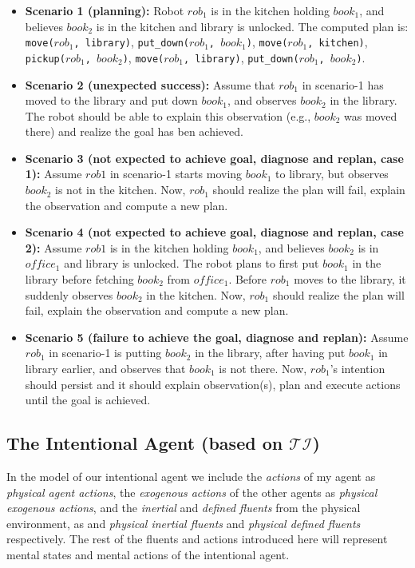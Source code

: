 \documentclass[11pt, oneside]{article}
\newcommand{\stt}[1]{{\small\texttt{#1}}}
\begin{document}
\begin{itemize}
\item \textbf{Scenario 1 (planning):} Robot $rob_1$ is in the kitchen
  holding $book_1$, and believes $book_2$ is in the kitchen and
  library is unlocked. The computed plan is: \stt{move($rob_1$,
    library)}, \stt{put\_down($rob_1$, $book_1$)}, \stt{move($rob_1$,
    kitchen)}, \stt{pickup($rob_1$, $book_2$)}, \stt{move($rob_1$,
    library)}, \stt{put\_down($rob_1$, $book_2$)}.

\item \textbf{Scenario 2 (unexpected success):} Assume that $rob_1$ in
  scenario-1 has moved to the library and put down $book_1$, and
  observes $book_2$ in the library. The robot should be able to
  explain this observation (e.g., $book_2$ was moved there) and
  realize the goal has ben achieved.

\item \textbf{Scenario 3 (not expected to achieve goal, diagnose and
    replan, case 1):} Assume $rob1$ in scenario-1 starts moving
  $book_1$ to library, but observes $book_2$ is not in the kitchen.
  Now, $rob_1$ should realize the plan will fail, explain the
  observation and compute a new plan.

\item \textbf{Scenario 4 (not expected to achieve goal, diagnose and
    replan, case 2):} Assume $rob1$ is in the kitchen holding $book_1$,
  and believes $book_2$ is in $office_1$ and library is unlocked. The
  robot plans to first put $book_1$ in the library before fetching
  $book_2$ from $office_1$. Before $rob_1$ moves to the library, it
  suddenly observes $book_2$ in the kitchen.  Now, $rob_1$ should
  realize the plan will fail, explain the observation and compute a
  new plan.

\item \textbf{Scenario 5 (failure to achieve the goal, diagnose and
    replan):} Assume $rob_1$ in scenario-1 is putting $book_2$ in the
  library, after having put $book_1$ in library earlier, and observes
  that $book_1$ is not there. Now, $rob_1$'s intention should persist
  and it should explain observation(s), plan and execute actions until
  the goal is achieved.
\end{itemize}




\subsection{The Intentional Agent (based on $\mathcal{TI}$) }
In the model of our intentional agent we include the \emph{actions} of my agent as \emph{physical  agent  actions},  the \emph{exogenous actions} of the other agents as \emph{physical exogenous actions}, and the \emph{inertial} and \emph{defined fluents} from the physical environment, as  and \emph{physical  inertial  fluents} and \emph{physical defined fluents} respectively. The rest of the fluents and actions introduced here will represent mental states and mental actions of the intentional agent. 
\end{document}
